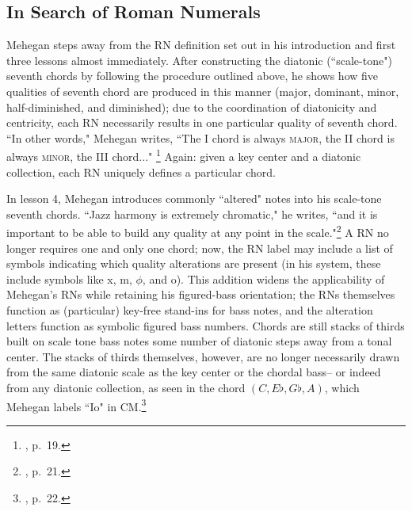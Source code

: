 \subsection{In Search of Roman Numerals}
Mehegan steps away from the RN definition set out in his introduction and first three lessons almost immediately.  After constructing the diatonic (``scale-tone") seventh chords by following the procedure outlined above, he shows how five qualities of seventh chord are produced in this manner (major, dominant, minor, half-diminished, and diminished); due to the coordination of diatonicity and centricity, each RN necessarily results in one particular quality of seventh chord.  ``In other words," Mehegan writes, ``The I chord is always \textsc{major}, the II chord is always \textsc{minor}, the III chord..." \footnote{\cite{mehegan1959}, p.\ 19.}  Again: given a key center and a diatonic collection, each RN uniquely defines a particular chord.

In lesson 4, Mehegan introduces commonly ``altered" notes into his scale-tone seventh chords.  ``Jazz harmony is extremely chromatic," he writes, ``and it is important to be able to build any quality at any point in the scale."\footnote{\cite{mehegan1959}, p.\ 21.}  A RN no longer requires one and only one chord; now, the RN label may include a list of symbols indicating which quality alterations are present (in his system, these include symbols like x, m, $\phi$, and o).  This addition widens the applicability of Mehegan's RNs while retaining his figured-bass orientation; the RNs themselves function as (particular) key-free stand-ins for bass notes, and the alteration letters function as symbolic figured bass numbers.  Chords are still stacks of thirds built on scale tone bass notes some number of diatonic steps away from a tonal center.  The stacks of thirds themselves, however, are no longer necessarily drawn from the same diatonic scale as the key center or the chordal bass-- or indeed from any diatonic collection, as seen in the chord $(C,E\flat,G\flat,A)$, which Mehegan labels ``Io" in CM.\footnote{\cite{mehegan1959}, p.\ 22.}

